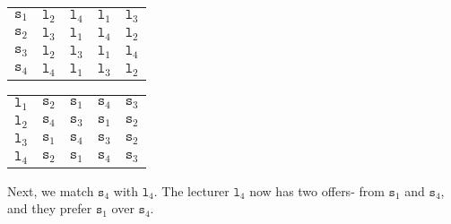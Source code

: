 \documentclass[a4paper, openany]{memoir}
\begin{document}
    \begin{table}[H]
        \centering
        \begin{subtable}{0.45\textwidth}
            \centering
            \begin{tabular}{c|cccc}
                $\texttt{s}_1$ & {\color{blue!60} $\texttt{l}_2$} & \underline{$\texttt{l}_4$} & $\texttt{l}_1$ & $\texttt{l}_3$ \\
                $\texttt{s}_2$ & \underline{$\texttt{l}_3$} & $\texttt{l}_1$ & $\texttt{l}_4$ & $\texttt{l}_2$ \\
                $\texttt{s}_3$ & \underline{$\texttt{l}_2$} & $\texttt{l}_3$ & $\texttt{l}_1$ & $\texttt{l}_4$ \\
                $\texttt{s}_4$ & \underline{$\texttt{l}_4$} & $\texttt{l}_1$ & $\texttt{l}_3$ & $\texttt{l}_2$
            \end{tabular}
        \end{subtable}
        \hfill
        \begin{subtable}{0.45\textwidth}
            \centering
            \begin{tabular}{c|cccc}
                $\texttt{l}_1$ & $\texttt{s}_2$ & $\texttt{s}_1$ & $\texttt{s}_4$ & $\texttt{s}_3$ \\
                $\texttt{l}_2$ & $\texttt{s}_4$ & \underline{$\texttt{s}_3$} & $\texttt{s}_1$ & $\texttt{s}_2$ \\
                $\texttt{l}_3$ & $\texttt{s}_1$ & $\texttt{s}_4$ & $\texttt{s}_3$ & \underline{$\texttt{s}_2$} \\
                $\texttt{l}_4$ & $\texttt{s}_2$ & \underline{$\texttt{s}_1$} & \underline{$\texttt{s}_4$} & $\texttt{s}_3$
            \end{tabular}
        \end{subtable}
    \end{table}
    \noindent Next, we match $\texttt{s}_4$ with $\texttt{l}_4$. The lecturer $\texttt{l}_4$ now has two offers- from $\texttt{s}_1$ and $\texttt{s}_4$, and they prefer $\texttt{s}_1$ over $\texttt{s}_4$. 
\end{document}
